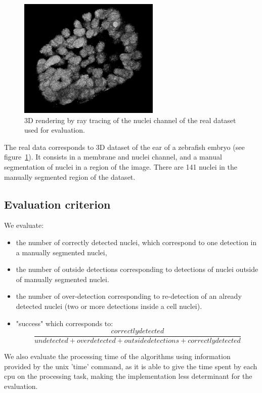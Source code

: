\begin{figure}[htb]
\begin{center}
\leavevmode
\includegraphics[width=0.6\textwidth]{pictures/rawRaycast}
\end{center}
\caption{3D rendering by ray tracing of the nuclei channel of the real dataset used for evaluation.}
\label{fig:rawRaycast}
\end{figure}

The real data corresponds to 3D dataset of the ear of a zebrafish embryo (see figure~\ref{fig:rawRaycast}).
It consists in a membrane and nuclei channel, and a manual segmentation of nuclei in a region of the image.
There are 141 nuclei in the manually segmented region of the dataset. 

\subsection{Evaluation criterion}

We evaluate:
\begin{itemize}
\item the number of correctly detected nuclei, which correspond to one detection in a manually segmented nuclei,
\item the number of outside detections corresponding to detections of nuclei outside of manually segmented nuclei.
\item the number of over-detection corresponding to re-detection of an already detected nuclei (two or more detections inside a cell nuclei).
\item "success" which corresponds to:\\
 \[
 \frac{correctly detected}{undetected + over detected + outside detections + correctly detected} 
 \]
\end{itemize} 

We also evaluate the processing time of the algorithms using information provided by the unix 'time' command, as it is able to give the time spent by each cpu on the processing task, making the implementation less determinant for the evaluation.


